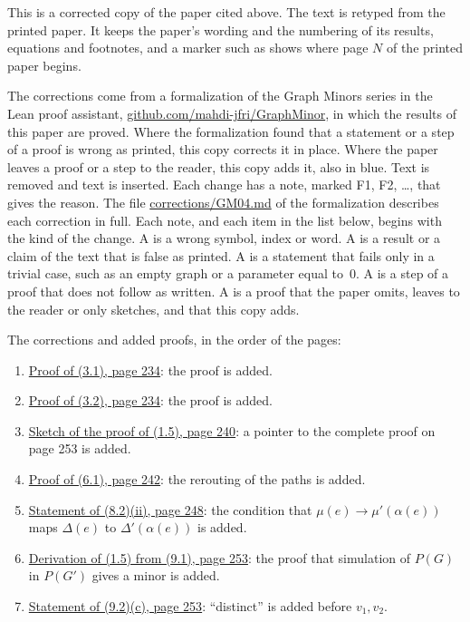 
This is a corrected copy of the paper cited above. The text is retyped from the printed paper.
It keeps the paper's wording and the numbering of its results, equations and footnotes, and a
marker such as  shows where page $N$ of the printed paper begins.

The corrections come from a formalization of the Graph Minors series in the Lean proof
assistant, \href{https://github.com/mahdi-jfri/GraphMinor}{github.com/mahdi-jfri/GraphMinor},
in which the results of this paper are proved. Where the formalization found that a statement
or a step of a proof is wrong as printed, this copy corrects it in place. Where the paper leaves a proof or a step to the reader, this copy adds it, also in blue. Text  is removed and text  is inserted. Each change has a note, marked
\textcolor{fixcolor}{\sffamily F1}, \textcolor{fixcolor}{\sffamily F2}, \dots, that gives the
reason. The file
\href{https://github.com/mahdi-jfri/GraphMinor/blob/main/corrections/GM04.md}{corrections/GM04.md}
of the formalization describes each correction in full. Each note, and each item in the list below, begins with the kind of the change. A  is a wrong symbol, index or word. A  is a result or a claim of the text that is false as printed. A  is a statement that fails only in a trivial case, such as an empty graph or a parameter equal to~$0$. A  is a step of a proof that does not follow as written. A  is a proof that the paper omits, leaves to the reader or only sketches, and that this copy adds.

The corrections and added proofs, in the order of the pages:
\begin{enumerate}\setlength{\itemsep}{1pt}
\item {}\hyperref[fix:3.1-proof-added]{Proof of (3.1), page 234}: the proof is added.
\item {}\hyperref[fix:3.2-proof-added]{Proof of (3.2), page 234}: the proof is added.
\item {}\hyperref[fix:1.5-sketch]{Sketch of the proof of (1.5), page 240}: a pointer to the complete proof on page 253 is added.
\item {}\hyperref[fix:6.1-proof-added]{Proof of (6.1), page 242}: the rerouting of the paths is added.
\item {}\hyperref[fix:8.2]{Statement of (8.2)(ii), page 248}: the condition that $\mu(e)\to\mu'(\alpha(e))$ maps $\Delta(e)$ to $\Delta'(\alpha(e))$ is added.
\item {}\hyperref[fix:9.1-1.5-proof-added]{Derivation of (1.5) from (9.1), page 253}: the proof that simulation of $P(G)$ in $P(G')$ gives a minor is added.
\item {}\hyperref[fix:9.2]{Statement of (9.2)(c), page 253}: ``distinct'' is added before $v_1, v_2$.
\end{enumerate}
